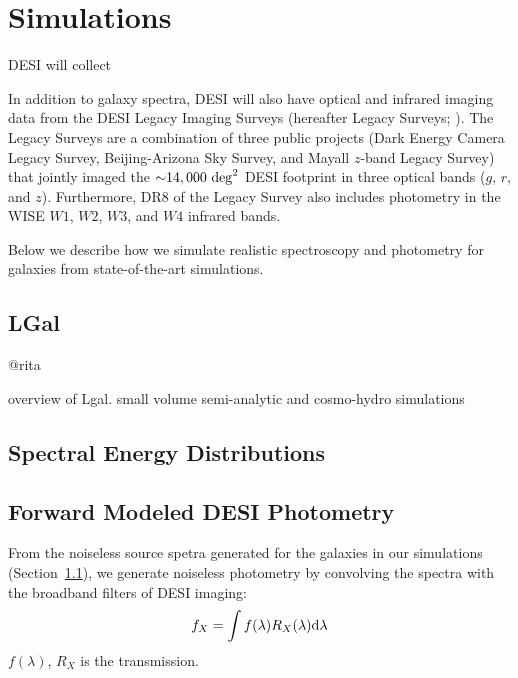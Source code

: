 \section{Simulations}\label{sec:sims}
DESI will collect  

In addition to galaxy spectra, DESI will also have optical and infrared 
imaging data from the  DESI Legacy Imaging Surveys (hereafter Legacy Surveys; 
\cite{dey2019}). The Legacy Surveys are a combination of three public projects 
(Dark Energy Camera Legacy Survey, Beijing-Arizona Sky Survey, and Mayall 
$z$-band Legacy Survey) that jointly imaged the ${\sim}14,000~{\rm deg}^2$ DESI 
footprint in three optical bands ($g$, $r$, and $z$). Furthermore, DR8 of the
Legacy Survey also includes photometry in the WISE $W1$, $W2$, $W3$, and $W4$ 
infrared bands. 

Below we describe how we simulate realistic spectroscopy and photometry 
for galaxies from state-of-the-art simulations.  

\subsection{LGal} \label{sec:lgal}
@rita

overview of Lgal. small volume semi-analytic and cosmo-hydro simulations


\subsection{Spectral Energy Distributions} \label{sec:sed}


\subsection{Forward Modeled DESI Photometry} \label{sec:photo} 
From the noiseless source spetra generated for the galaxies in our simulations 
(Section~\ref{sec:lgal}), we generate noiseless photometry by convolving the
spectra with the broadband filters of DESI imaging: 
\begin{equation}
     f_X = \int f(\lambda) R_X(\lambda) {\rm d}\lambda
\end{equation}
$f(\lambda)$, $R_X$ is the transmission. 

